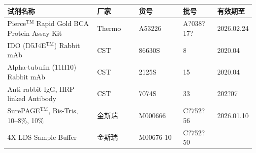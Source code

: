 \documentclass[UTF8,10pt,a4paper,fontset=fandol]{ctexart}
\newcommand{\fieldvalue}[1]{#1}
\newcommand{\handwritten}[1]{#1}
\begin{document}
\begin{center}
\small
\begin{tabular}{|p{0.37\linewidth}|p{0.17\linewidth}|p{0.18\linewidth}|p{0.14\linewidth}|p{0.14\linewidth}|}
\hline
\textbf{试剂名称} & \textbf{厂家} & \textbf{货号} & \textbf{批号} & \textbf{有效期至} \\
\hline
Pierce$^{\mathrm{TM}}$ Rapid Gold BCA Protein Assay Kit
& Thermo & A53226 &
\fieldvalue{\handwritten{A?038?17?}} &
\fieldvalue{\handwritten{2026.02.24}} \\
\hline
IDO (D5J4E$^{\mathrm{TM}}$) Rabbit mAb & CST & 86630S &
\fieldvalue{\handwritten{8}} &
\fieldvalue{\handwritten{2020.04}} \\
\hline
Alpha-tubulin (11H10) Rabbit mAb & CST & 2125S &
\fieldvalue{\handwritten{15}} &
\fieldvalue{\handwritten{2020.04}} \\
\hline
Anti-rabbit IgG, HRP-linked Antibody & CST & 7074S &
\fieldvalue{\handwritten{33}} &
\fieldvalue{\handwritten{202?07}} \\
\hline
SurePAGE$^{\mathrm{TM}}$, Bis-Tris, 10--8\%, 10\% & 金斯瑞 & M000666 &
\fieldvalue{\handwritten{C?752?56}} &
\fieldvalue{\handwritten{2026.01.10}} \\
\hline
4X LDS Sample Buffer & 金斯瑞 & M00676-10 &
\fieldvalue{\handwritten{C?752?50}} &

\end{tabular}
\end{center}
\end{document}

